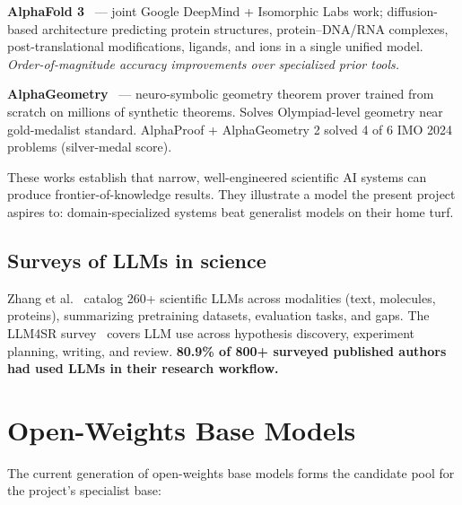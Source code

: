 \documentclass[11pt]{article}
\begin{document}
\textbf{AlphaFold 3}~\cite{abramson2024alphafold3} --- joint Google DeepMind + Isomorphic Labs work; diffusion-based architecture predicting protein structures, protein--DNA/RNA complexes, post-translational modifications, ligands, and ions in a single unified model. \emph{Order-of-magnitude accuracy improvements over specialized prior tools.}

\textbf{AlphaGeometry}~\cite{trinh2024alphageometry} --- neuro-symbolic geometry theorem prover trained from scratch on millions of synthetic theorems. Solves Olympiad-level geometry near gold-medalist standard. AlphaProof + AlphaGeometry 2 solved 4 of 6 IMO 2024 problems (silver-medal score).

These works establish that narrow, well-engineered scientific AI systems can produce frontier-of-knowledge results. They illustrate a model the present project aspires to: domain-specialized systems beat generalist models on their home turf.

\subsection{Surveys of LLMs in science}

Zhang et al.~\cite{zhang2024scillmsurvey} catalog 260+ scientific LLMs across modalities (text, molecules, proteins), summarizing pretraining datasets, evaluation tasks, and gaps. The LLM4SR survey~\cite{zhang2025llm4sr} covers LLM use across hypothesis discovery, experiment planning, writing, and review. \textbf{80.9\% of 800+ surveyed published authors had used LLMs in their research workflow.}

\section{Open-Weights Base Models}

The current generation of open-weights base models forms the candidate pool for the project's specialist base:
\end{document}
